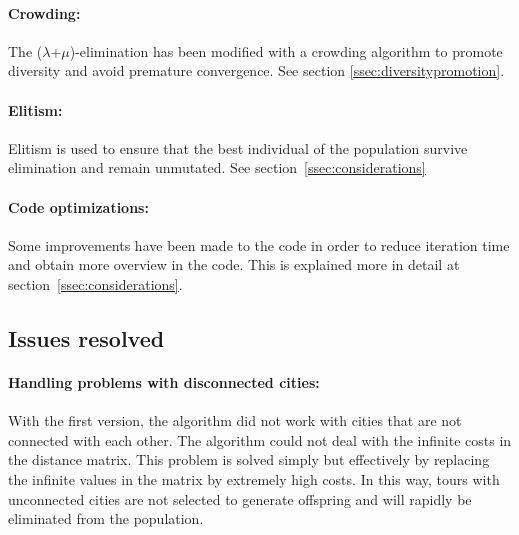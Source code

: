 \documentclass[a4paper,10pt]{article}
\newcommand{\ReplaceMe}[1]{{\color{blue}#1}}
\begin{document}
\paragraph{Crowding:} The ($\lambda$+$\mu$)-elimination has been modified with a crowding algorithm to promote diversity and avoid premature convergence. See section \ref{ssec:diversitypromotion}.
\paragraph{Elitism:} Elitism is used to ensure that the best individual of the population survive elimination and remain unmutated. See section~\ref{ssec:considerations}
\paragraph{Code optimizations:} Some improvements have been made to the code in order to reduce iteration time and obtain more overview in the code. This is explained more in detail at section~\ref{ssec:considerations}.


\subsection{Issues resolved}\label{sec:resolved}

\paragraph{Handling problems with disconnected cities:} With the first version, the algorithm did not work with cities that are not connected with each other. The algorithm could not deal with the infinite costs in the distance matrix. This problem is solved simply but effectively by replacing the infinite values in the matrix by extremely high costs. In this way, tours with unconnected cities are not selected to generate offspring and will rapidly be eliminated from the population.
\end{document}
